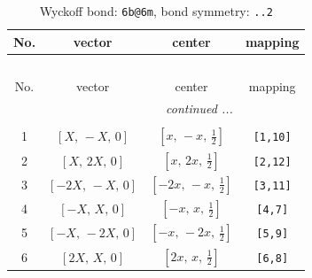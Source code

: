 \documentclass[fleqn,8pt]{jsarticle}
\begin{document}
\begin{longtable}{cccc}
\caption{Wyckoff bond: {\tt 6b@6m}, bond symmetry: {\tt ..2}}
 \\
 \hline \hline
No. & vector & center & mapping \\ \hline \endfirsthead

\multicolumn{3}{l}{\tablename\ \thetable{}} \\
 \hline \hline
No. & vector & center & mapping \\ \hline \endhead

 \hline \hline
\multicolumn{3}{r}{\footnotesize\it continued ...} \\ \endfoot

 \hline \hline
\multicolumn{3}{r}{} \\ \endlastfoot

1 & $\left[ X,\, - X,\, 0 \right]$ & $\left[ x,\, - x,\, \frac{1}{2} \right]$ & {\tt [1,10]} \\ \hline
2 & $\left[ X,\, 2 X,\, 0 \right]$ & $\left[ x,\, 2 x,\, \frac{1}{2} \right]$ & {\tt [2,12]} \\ \hline
3 & $\left[ - 2 X,\, - X,\, 0 \right]$ & $\left[ - 2 x,\, - x,\, \frac{1}{2} \right]$ & {\tt [3,11]} \\ \hline
4 & $\left[ - X,\, X,\, 0 \right]$ & $\left[ - x,\, x,\, \frac{1}{2} \right]$ & {\tt [4,7]} \\ \hline
5 & $\left[ - X,\, - 2 X,\, 0 \right]$ & $\left[ - x,\, - 2 x,\, \frac{1}{2} \right]$ & {\tt [5,9]} \\ \hline
6 & $\left[ 2 X,\, X,\, 0 \right]$ & $\left[ 2 x,\, x,\, \frac{1}{2} \right]$ & {\tt [6,8]} \\
\end{longtable}
\renewcommand{\arraystretch}{1.2}
\end{document}
